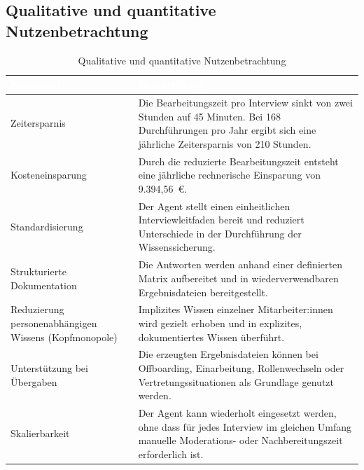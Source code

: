 \documentclass[
  10pt,
  ngerman,
  a4paper,
  toc=graduated,
  numbers=noenddot,
  headings=standardclasses,
  nonumberlist
]{scrartcl}
\begin{document}
\newpage
\subsection{Qualitative und quantitative Nutzenbetrachtung}
\label{anhang_nutzenbetrachtung}

\begin{table}[H]
\centering
\begin{tabularx}{\textwidth}{|Y|Y|}
\hline
{}
\textcolor{white}{\textbf{Nutzenart}} 
& \textcolor{white}{\textbf{Beschreibung}} \\
\hline

Zeitersparnis 
& Die Bearbeitungszeit pro Interview sinkt von zwei Stunden auf 45 Minuten. Bei 168 Durchführungen pro Jahr ergibt sich eine jährliche Zeitersparnis von 210 Stunden. \\
\hline

Kosteneinsparung 
& Durch die reduzierte Bearbeitungszeit entsteht eine jährliche rechnerische Einsparung von 9.394,56~\euro{}. \\
\hline

Standardisierung 
& Der Agent stellt einen einheitlichen Interviewleitfaden bereit und reduziert Unterschiede in der Durchführung der Wissenssicherung. \\
\hline

Strukturierte Dokumentation 
& Die Antworten werden anhand einer definierten Matrix aufbereitet und in wiederverwendbaren Ergebnisdateien bereitgestellt. \\
\hline

Reduzierung personenabhängigen Wissens (Kopfmonopole)
& Implizites Wissen einzelner Mitarbeiter:innen wird gezielt erhoben und in explizites, dokumentiertes Wissen überführt. \\
\hline

Unterstützung bei Übergaben 
& Die erzeugten Ergebnisdateien können bei Offboarding, Einarbeitung, Rollenwechseln oder Vertretungssituationen als Grundlage genutzt werden. \\
\hline

Skalierbarkeit 
& Der Agent kann wiederholt eingesetzt werden, ohne dass für jedes Interview im gleichen Umfang manuelle Moderations- oder Nachbereitungszeit erforderlich ist. \\
\hline

\end{tabularx}
\caption{Qualitative und quantitative Nutzenbetrachtung}
\label{tab:nutzenbetrachtung}
\end{table}
\end{document}
